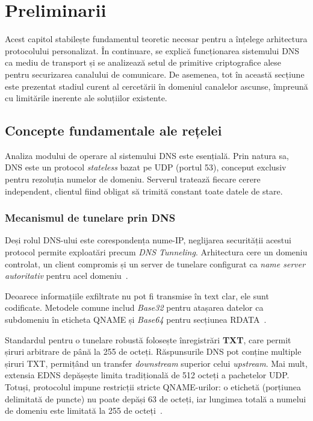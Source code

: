 \section{Preliminarii}

Acest capitol stabilește fundamentul teoretic necesar pentru a înțelege arhitectura protocolului personalizat. În continuare, se explică funcționarea sistemului DNS ca mediu de transport și se analizează setul de primitive criptografice alese pentru securizarea canalului de comunicare. De asemenea, tot în această secțiune este prezentat stadiul curent al cercetării în domeniul canalelor ascunse, împreună cu limitările inerente ale soluțiilor existente.

\subsection{Concepte fundamentale ale rețelei}
Analiza modului de operare al sistemului DNS este esențială. Prin natura sa, DNS este un protocol \textit{stateless} bazat pe UDP (portul 53), conceput exclusiv pentru rezoluția numelor de domeniu. Serverul tratează fiecare cerere independent, clientul fiind obligat să trimită constant toate datele de stare.

\subsubsection{Mecanismul de tunelare prin DNS}
Deși rolul DNS-ului este corespondența nume-IP, neglijarea securității acestui protocol permite exploatări precum \textit{DNS Tunneling}. Arhitectura cere un domeniu controlat, un client compromis și un server de tunelare configurat ca \textit{name server autoritativ} pentru acel domeniu~\cite{farnham_dns_tunneling}.

Deoarece informațiile exfiltrate nu pot fi transmise în text clar, ele sunt codificate. Metodele comune includ \textit{Base32} pentru atașarea datelor ca subdomeniu în eticheta QNAME și \textit{Base64} pentru secțiunea RDATA~\cite{farnham_dns_tunneling}. 

Standardul pentru o tunelare robustă folosește înregistrări \textbf{TXT}, care permit șiruri arbitrare de până la 255 de octeți. Răspunsurile DNS pot conține multiple șiruri TXT, permițând un transfer \textit{downstream} superior celui \textit{upstream}. Mai mult, extensia EDNS depășește limita tradițională de 512 octeți a pachetelor UDP. Totuși, protocolul impune restricții stricte QNAME-urilor: o etichetă (porțiunea delimitată de puncte) nu poate depăși 63 de octeți, iar lungimea totală a numelui de domeniu este limitată la 255 de octeți~\cite{farnham_dns_tunneling}.

